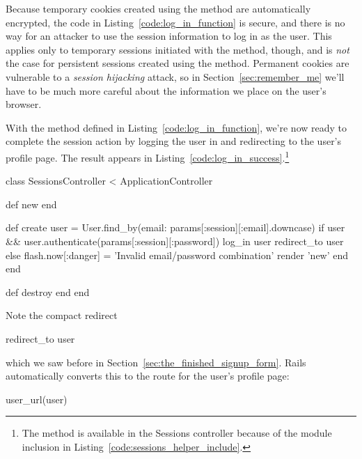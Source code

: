 Because temporary cookies created using the  method are automatically encrypted, the code in Listing~\ref{code:log_in_function} is secure, and there is no way for an attacker to use the session information to log in as the user. This applies only to temporary sessions initiated with the  method, though, and is \emph{not} the case for persistent sessions created using the  method. Permanent cookies are vulnerable to a \emph{session hijacking} attack, so in Section~\ref{sec:remember_me} we'll have to be much more careful about the information we place on the user's browser.

With the  method defined in Listing~\ref{code:log_in_function}, we're now ready to complete the session  action by logging the user in and redirecting to the user's profile page. The result appears in Listing~\ref{code:log_in_success}.\footnote{The  method is available in the Sessions controller because of the module inclusion in Listing~\ref{code:sessions_helper_include}.}

\begin{codelisting}
\label{code:log_in_success}
\begin{code}
class SessionsController < ApplicationController

  def new
  end

  def create
    user = User.find_by(email: params[:session][:email].downcase)
    if user && user.authenticate(params[:session][:password])
      log_in user
      redirect_to user
    else
      flash.now[:danger] = 'Invalid email/password combination'
      render 'new'
    end
  end

  def destroy
  end
end
\end{code}
\end{codelisting}

\noindent Note the compact redirect

\begin{code}
redirect_to user
\end{code}

\noindent which we saw before in Section~\ref{sec:the_finished_signup_form}. Rails automatically converts this to the route for the user's profile page:

\begin{code}
user_url(user)
\end{code}

